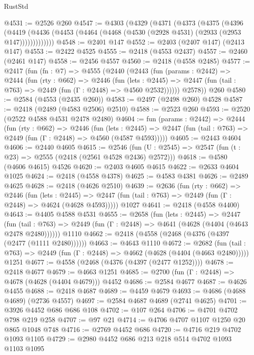 \begin{lexlean}{RustStd}
\begin{coremodule}
@4531 := @2526 @260
@4547 := @4303
    (@4329
      (@4371
        (@4373
          (@4375
            (@4396
              (@4419
                (@4436 (@4453 (@4464 (@4468 (@4530 (@2928 @4531) (@2933 (@2953 @147)))))))))))))
@4548 := @2401 @147
@4552 := @2403 (@2407 @147) (@2413 @147)
@4553 := @2422 @4525
@4555 := @2418 (@4553 @2437)
@4557 := @2460 (@2461 @147)
@4558 := @2456 @4557
@4560 := @2418 (@4558 @2485)
@4577 := @2417
    (fun (fn : @7) =>
    @4555
      (@2440
        (@2443
          (fun (params : @2442) =>
          @2444
            (fun (rty : @662) =>
            @2446
              (fun (lets : @2445) =>
              @2447 (fun (tail : @763) => @2449 (fun (Γ : @2448) => @4560 @2532))))))
        @2578))
    @260
@4580 := @2584 (@4553 (@2435 @260))
@4583 := @2497 (@2498 @260) @4528
@4587 := @2418 (@2489 (@4583 @2506) @2510)
@4588 := @2523 @260
@4593 := @2520 (@2522 @4588 @4531 @2478 @2480)
@4604 := fun (params : @2442) =>
  @2444
    (fun (rty : @662) =>
    @2446
      (fun (lets : @2445) =>
      @2447 (fun (tail : @763) => @2449 (fun (Γ : @2448) => @4560 (@4587 @4593)))))
@4605 := @2443 @4604
@4606 := @2440 @4605
@4615 := @2546 (fun (U : @2545) => @2547 (fun (t : @23) => @2555 (@2418 (@2561 @4528 @2436) @2572)))
@4618 := @4580 (@4606 @4615) @4526
@4620 := @2403 @4605 @4615
@4622 := @2633 @4604 @1025
@4624 := @2418 (@4558 @4378)
@4625 := @4583 @4381
@4626 := @2489 @4625
@4628 := @2418 (@4626 @2510)
@4639 := @2636
    (fun (rty : @662) =>
    @2446
      (fun (lets : @2445) =>
      @2447 (fun (tail : @763) => @2449 (fun (Γ : @2448) => @4624 (@4628 @4593)))))
    @1027
@4641 := @2418 (@4558 @4400)
@4643 := @4405 @4588 @4531
@4655 := @2658
    (fun (lets : @2445) =>
    @2447
      (fun (tail : @763) => @2449 (fun (Γ : @2448) => @4641 (@4628 (@4404 (@4643 @2478 @2480))))))
    @1110
@4662 := @2418 (@4558 (@2468 (@4376 (@4397 (@2477 (@1111 @2480))))))
@4663 := @4643 @1110
@4672 := @2682
    (fun (tail : @763) => @2449 (fun (Γ : @2448) => @4662 (@4628 (@4404 (@4663 @2480)))))
    @1251
@4677 := @4558 (@2468 (@4376 (@4397 (@2477 @1252))))
@4678 := @2418 @4677
@4679 := @4663 @1251
@4685 := @2700 (fun (Γ : @2448) => @4678 (@4628 (@4404 @4679))) @4452
@4686 := @2584 @4677
@4687 := @4626 @4455
@4688 := @2418 @4687
@4689 := @4459 @4679
@4693 := @4686 (@4688 @4689) (@2736 @4557)
@4697 := @2584 @4687 @4689 (@2741 @4625)
@4701 := @3926 @4452 @686 @686 @108
@4702 := @107 @264
@4706 := @4701 @4702 @798 @219 @258
@4707 := @97 @21
@4714 := @4706 @4707 @1107 @1250 @20 @865 @1048 @748
@4716 := @2769 @4452 @686
@4720 := @4716 @219 @4702 @1093 @1105
@4729 := @2980 @4452 @686 @213 @218 @514 @4702 @1093 @1103 @1095

\end{coremodule}
\end{lexlean}
